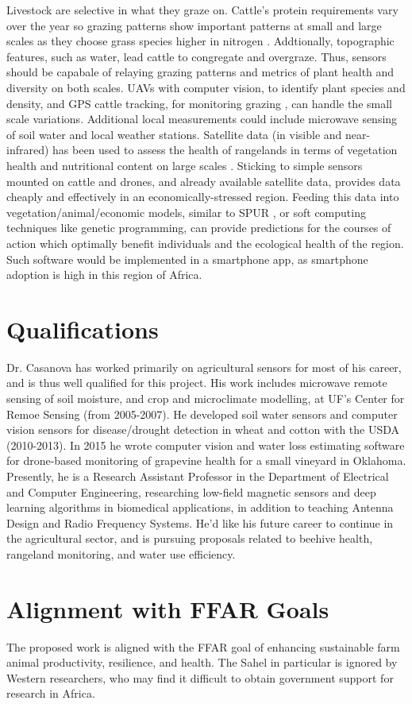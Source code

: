 \documentclass[11pt,letterpaper]{article}
\newcommand{\required}[1]{\section*{\hfil #1\hfil}}                    %
\begin{document}
Livestock are selective in what they graze on. Cattle's protein requirements vary over the year so grazing patterns show important patterns at small and large scales as they choose grass species higher in nitrogen \cite{coughenour1991spatial}. Addtionally, topographic features, such as water, lead cattle to congregate and overgraze. Thus, sensors should be capabale of relaying grazing patterns and metrics of plant health and diversity on both scales. UAVs with computer vision, to identify plant species and density, and GPS cattle tracking, for monitoring grazing \cite{wark2007transforming}, can handle the small scale variations. Additional local measurements could include microwave sensing of soil water and local weather stations. Satellite data (in visible and near-infrared) has been used to assess the health of rangelands in terms of vegetation health and nutritional content on large scales \cite{knox2012remote}. Sticking to simple sensors mounted on cattle and drones, and already available satellite data, provides data cheaply and effectively in an economically-stressed region. Feeding this data into vegetation/animal/economic models, similar to SPUR \cite{carlson1996comprehensive}, or soft computing techniques like genetic programming, can provide predictions for the courses of action which optimally benefit individuals and the ecological health of the region. Such software would be implemented in a smartphone app, as smartphone adoption is high in this region of Africa.

\required{Qualifications}
Dr. Casanova has worked primarily on agricultural sensors for most of his career, and is thus well qualified for this project. His work includes microwave remote sensing of soil moisture, and crop and microclimate modelling, at UF's Center for Remoe Sensing (from 2005-2007). He developed soil water sensors and computer vision sensors for disease/drought detection in wheat and cotton with the USDA (2010-2013). In 2015 he wrote computer vision and water loss estimating software for drone-based monitoring of grapevine health for a small vineyard in Oklahoma. Presently, he is a Research Assistant Professor in the Department of Electrical and Computer Engineering, researching low-field magnetic sensors and deep learning algorithms in biomedical applications, in addition to teaching Antenna Design and Radio Frequency Systems. He'd like his future career to continue in the agricultural sector, and is pursuing proposals related to beehive health, rangeland monitoring, and water use efficiency.   

\required{Alignment with FFAR Goals}

The proposed work is aligned with the FFAR goal of enhancing sustainable farm animal productivity, resilience, and health. The Sahel in particular is ignored by Western researchers, who may find it difficult to obtain government support for research in Africa.


\end{document}
